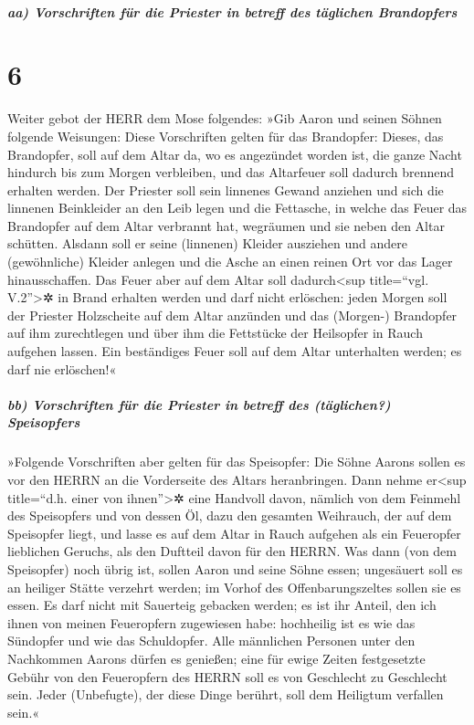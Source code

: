 \hypertarget{aa-vorschriften-fuxfcr-die-priester-in-betreff-des-tuxe4glichen-brandopfers}{%
\subparagraph{aa) Vorschriften für die Priester in betreff des täglichen
Brandopfers}\label{aa-vorschriften-fuxfcr-die-priester-in-betreff-des-tuxe4glichen-brandopfers}}

\hypertarget{section-5}{%
\section{6}\label{section-5}}

Weiter gebot der HERR dem Mose folgendes:
»Gib Aaron und seinen Söhnen folgende Weisungen: Diese
Vorschriften gelten für das Brandopfer: Dieses, das Brandopfer, soll auf
dem Altar da, wo es angezündet worden ist, die ganze Nacht hindurch bis
zum Morgen verbleiben, und das Altarfeuer soll dadurch brennend erhalten
werden. Der Priester soll sein linnenes Gewand anziehen
und sich die linnenen Beinkleider an den Leib legen und die Fettasche,
in welche das Feuer das Brandopfer auf dem Altar verbrannt hat,
wegräumen und sie neben den Altar schütten. Alsdann soll
er seine (linnenen) Kleider ausziehen und andere (gewöhnliche) Kleider
anlegen und die Asche an einen reinen Ort vor das Lager hinausschaffen.
Das Feuer aber auf dem Altar soll dadurch\textless sup
title=``vgl. V.2''\textgreater✲ in Brand erhalten werden und darf nicht
erlöschen: jeden Morgen soll der Priester Holzscheite auf dem Altar
anzünden und das (Morgen-) Brandopfer auf ihm zurechtlegen und über ihm
die Fettstücke der Heilsopfer in Rauch aufgehen lassen.
Ein beständiges Feuer soll auf dem Altar unterhalten
werden; es darf nie erlöschen!«

\hypertarget{bb-vorschriften-fuxfcr-die-priester-in-betreff-des-tuxe4glichen-speisopfers}{%
\subparagraph{bb) Vorschriften für die Priester in betreff des
(täglichen?)
Speisopfers}\label{bb-vorschriften-fuxfcr-die-priester-in-betreff-des-tuxe4glichen-speisopfers}}

»Folgende Vorschriften aber gelten für das Speisopfer: Die
Söhne Aarons sollen es vor den HERRN an die Vorderseite des Altars
heranbringen. Dann nehme er\textless sup title=``d.h.
einer von ihnen''\textgreater✲ eine Handvoll davon, nämlich von dem
Feinmehl des Speisopfers und von dessen Öl, dazu den gesamten Weihrauch,
der auf dem Speisopfer liegt, und lasse es auf dem Altar in Rauch
aufgehen als ein Feueropfer lieblichen Geruchs, als den Duftteil davon
für den HERRN. Was dann (von dem Speisopfer) noch übrig
ist, sollen Aaron und seine Söhne essen; ungesäuert soll es an heiliger
Stätte verzehrt werden; im Vorhof des Offenbarungszeltes sollen sie es
essen. Es darf nicht mit Sauerteig gebacken werden; es
ist ihr Anteil, den ich ihnen von meinen Feueropfern zugewiesen habe:
hochheilig ist es wie das Sündopfer und wie das Schuldopfer.
Alle männlichen Personen unter den Nachkommen Aarons
dürfen es genießen; eine für ewige Zeiten festgesetzte Gebühr von den
Feueropfern des HERRN soll es von Geschlecht zu Geschlecht sein. Jeder
(Unbefugte), der diese Dinge berührt, soll dem Heiligtum verfallen
sein.«

